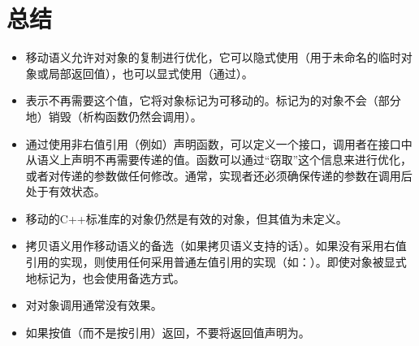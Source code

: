 \section{总结}
\begin{itemize}
	\item 移动语义允许对对象的复制进行优化，它可以隐式使用（用于未命名的临时对象或局部返回值），也可以显式使用（通过）。
	\item {}表示不再需要这个值，它将对象标记为可移动的。标记为的对象不会（部分地）销毁（析构函数仍然会调用）。
	\item 通过使用非右值引用（例如）声明函数，可以定义一个接口，调用者在接口中从语义上声明不再需要传递的值。函数可以通过“窃取”这个信息来进行优化，或者对传递的参数做任何修改。通常，实现者还必须确保传递的参数在调用后处于有效状态。
	\item 移动的C++标准库的对象仍然是有效的对象，但其值为未定义。
	\item 拷贝语义用作移动语义的备选（如果拷贝语义支持的话）。如果没有采用右值引用的实现，则使用任何采用普通左值引用的实现（如：）。即使对象被显式地标记为，也会使用备选方式。
	\item 对对象调用通常没有效果。
	\item 如果按值（而不是按引用）返回，不要将返回值声明为。
\end{itemize}

